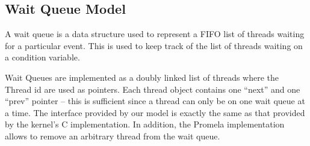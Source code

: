 \subsection{Wait Queue Model}


A wait queue is a data structure used to represent a FIFO list of
threads waiting for a particular event. This is used to keep track 
of the list of threads waiting on a condition variable. 



Wait Queues are implemented as a doubly linked list of threads where the 
Thread id are used as pointers. Each thread object contains one ``next''
and one ``prev'' pointer -- this is sufficient since
a thread can only be on one wait queue at a time.
The interface provided by our model is exactly the same as that
provided by the kernel's C implementation. In addition, the Promela
implementation allows to remove an arbitrary thread from the
wait queue.
 
